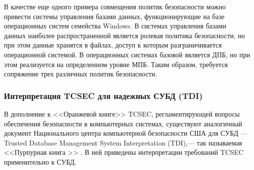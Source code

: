 В качестве еще одного примера совмещения политик безопасности можно привести системы управления базами данных, функционирующие на базе операционных систем семейства Windows. В системах управления базами данных наиболее распространенной является ролевая политика безопасности, но при этом данные хранятся в файлах, доступ к которым разграничивается операционной системой. В операционных системах базовой является ДПБ, но при этом реализуется на определенном уровне МПБ. Таким образом, требуется сопряжение трех различных политик безопасности. \cite{CombinedSecurityPolicies}

\subsubsection{Интерпретация TCSEC для надежных СУБД (TDI)}
В дополнение к <<Оранжевой книге>> TCSEC, регламентирующей вопросы обеспечения безопасности в компьютерных системах, существуют аналогичный документ Национального центра компьютерной безопасности США для СУБД --- Trusted Database Management System Interpretation (TDI),--- так называемая <<Пурпурная книга >> \cite{PurpleBook}.
В ней приведены интерпретации требований TCSEC применительно к СУБД.


